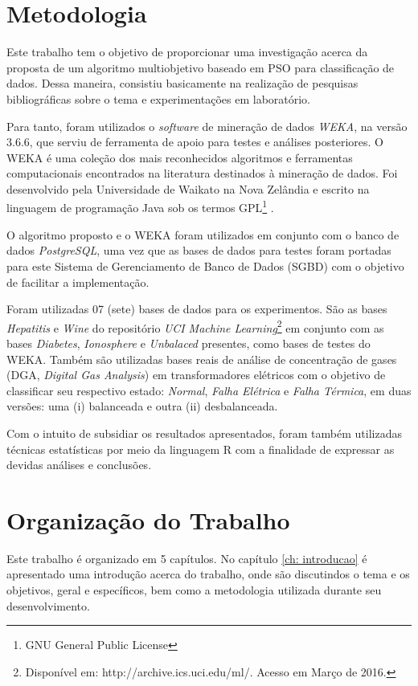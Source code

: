 \documentclass[
	12pt,				%
	openany,			%
	oneside,	
	a4paper,			%
	brazil,				%
	]{unimontes-ppgmsc-abntex2}
\begin{document}
\section{Metodologia}

Este trabalho tem o objetivo de proporcionar uma investigação acerca da proposta de um algoritmo multiobjetivo baseado em PSO para classificação de dados. Dessa maneira, consistiu basicamente na realização de pesquisas bibliográficas sobre o tema e experimentações em laboratório.  

Para tanto, foram utilizados o \textit{software} de mineração de dados {\em WEKA}, na versão 3.6.6, que serviu de ferramenta de apoio para testes e análises posteriores. O WEKA é uma coleção dos mais reconhecidos algoritmos e ferramentas computacionais encontrados na literatura destinados à mineração de dados. Foi desenvolvido pela Universidade de Waikato na Nova Zelândia e escrito na linguagem de programação Java sob os termos GPL\footnote{GNU General Public License} \cite{Witten_2005}.

O algoritmo proposto e o WEKA foram utilizados em conjunto com o banco de dados {\em PostgreSQL}, uma vez que as bases de dados para testes foram portadas para este Sistema de Gerenciamento de Banco de Dados (SGBD) com o objetivo de facilitar a implementação. 

Foram utilizadas 07 (sete) bases de dados para os experimentos. São as bases {\em Hepatitis} e {\em Wine} do repositório {\em UCI Machine Learning}\footnote{Disponível em: http://archive.ics.uci.edu/ml/. Acesso em Março de 2016.} em conjunto com as bases {\em Diabetes}, {\em Ionosphere} e {\em Unbalaced} presentes, como bases de testes do WEKA. Também são utilizadas bases reais de análise de concentração de gases (DGA, {\em Digital Gas Analysis}) em transformadores elétricos com o objetivo de classificar seu respectivo estado: {\em Normal}, {\em Falha Elétrica} e {\em Falha Térmica}, em duas versões: uma (i) balanceada e outra (ii) desbalanceada.

Com o intuito de subsidiar os resultados apresentados, foram também utilizadas técnicas estatísticas por meio da linguagem R com a finalidade de expressar as devidas análises e conclusões.

\section{Organização do Trabalho}

Este trabalho é organizado em 5 capítulos. No capítulo \ref{ch: introducao} é apresentado uma introdução acerca do trabalho, onde são discutindos o tema e os objetivos, geral e específicos, bem como a metodologia utilizada durante seu desenvolvimento. 
\end{document}
